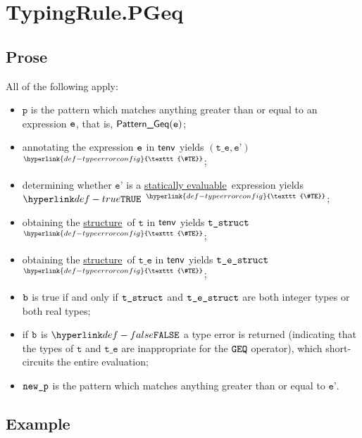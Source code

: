 \documentclass{book}
\newcommand\TypeErrorConfig[0]{\hyperlink{def-typeerrorconfig}{\texttt{\#TE}}}
\newcommand\ProseOrTypeError[0]{\hyperlink{def-proseortypeerror}{$^{\TypeErrorConfig}$}}
\newcommand\structure[0]{\hyperlink{def-structure}{structure}}
\newcommand\staticallyevaluable[0]{\hyperlink{def-staticallyevaluable}{statically evaluable}}
\newcommand\vp[0]{\texttt{p}}
\newcommand\vt[0]{\texttt{t}}
\newcommand\vte[0]{\texttt{t\_e}}
\newcommand\vep[0]{\texttt{e'}}
\begin{document}

\section{TypingRule.PGeq \label{sec:TypingRule.PGeq}}

\subsection{Prose}
All of the following apply:
\begin{itemize}
\item $\vp$ is the pattern which matches anything greater than or equal to an expression $\texttt{e}$,
that is, $\textsf{Pattern\_Geq}(\texttt{e})$;
\item annotating the expression $\texttt{e}$ in $\textsf{tenv}$ yields $(\vte, \vep)$ \ProseOrTypeError;
\item determining whether $\vep$ is a \staticallyevaluable\ expression yields $\True$ \ProseOrTypeError;
\item obtaining the \structure\ of $\vt$ in $\textsf{tenv}$ yields $\texttt{t\_struct}$ \ProseOrTypeError;
\item obtaining the \structure\ of $\vte$ in $\textsf{tenv}$ yields $\texttt{t\_e\_struct}$ \ProseOrTypeError;
\item $\texttt{b}$ is true if and only if $\texttt{t\_struct}$ and $\texttt{t\_e\_struct}$ are both integer types or both real types;
\item if $\texttt{b}$ is $\False$ a type error is returned (indicating that the types of $\vt$ and $\vte$
      are inappropriate for the $\texttt{GEQ}$ operator),
which short-circuits the entire evaluation;
\item $\texttt{new\_p}$ is the pattern which matches anything greater than or equal to $\vep$.
\end{itemize}

\subsection{Example}

\end{document}
